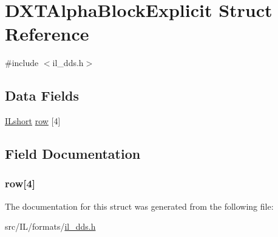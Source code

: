 \hypertarget{struct_d_x_t_alpha_block_explicit}{\section{D\-X\-T\-Alpha\-Block\-Explicit Struct Reference}
\label{struct_d_x_t_alpha_block_explicit}
}


{\ttfamily \#include $<$il\-\_\-dds.\-h$>$}

\subsection*{Data Fields}
\begin{DoxyCompactItemize}
\item 
\hyperlink{il_8h_afc75ded918970afe7517d3f7f0561db3}{I\-Lshort} \hyperlink{struct_d_x_t_alpha_block_explicit_abef0800bc2e26d39fb80fbcd55a2c82f}{row} \mbox{[}4\mbox{]}
\end{DoxyCompactItemize}


\subsection{Field Documentation}
\hypertarget{struct_d_x_t_alpha_block_explicit_abef0800bc2e26d39fb80fbcd55a2c82f}{
\subsubsection[{row}]{ row\mbox{[}4\mbox{]}}}\label{struct_d_x_t_alpha_block_explicit_abef0800bc2e26d39fb80fbcd55a2c82f}


The documentation for this struct was generated from the following file\-:\begin{DoxyCompactItemize}
\item 
src/\-I\-L/formats/\hyperlink{il__dds_8h}{il\-\_\-dds.\-h}\end{DoxyCompactItemize}
